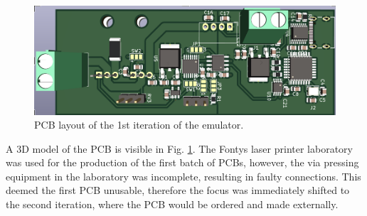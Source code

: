 \begin{figure}[h]
    \centering
    \includegraphics[scale=0.40]{pcb_1st_iteration.png}
    \caption{PCB layout of the 1st iteration of the emulator.}
    \label{fig:1st_pcb}
\end{figure}

A 3D model of the PCB is visible in Fig. \ref{fig:1st_pcb}.
The Fontys laser printer laboratory was used for the production 
of the first batch of PCBs, however, the via pressing equipment in the 
laboratory was incomplete, resulting in faulty connections. 
This deemed the first PCB unusable, therefore the focus was 
immediately shifted to the second iteration, where the PCB 
would be ordered and made externally.
